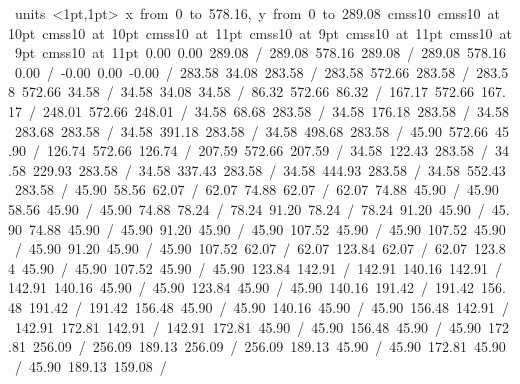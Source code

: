 \hbox{\beginpicture
\setcoordinatesystem units <1pt,1pt>
\setplotarea x from 0 to 578.16, y from 0 to 289.08
\setlinear
\font\picfont cmss10\picfont
\font\picfont cmss10 at 10pt\picfont
\font\picfont cmss10 at 10pt\picfont
\font\picfont cmss10 at 11pt\picfont
\font\picfont cmss10 at 9pt\picfont
\font\picfont cmss10 at 11pt\picfont
\font\picfont cmss10 at 9pt\picfont
\font\picfont cmss10 at 11pt\picfont
\setsolid
{} 0.00 0.00 289.08 /
 289.08 578.16 289.08 /
 289.08 578.16 0.00 /
 -0.00 0.00 -0.00 /
\setsolid
{} 283.58 34.08 283.58 /
 283.58 572.66 283.58 /
 283.58 572.66 34.58 /
 34.58 34.08 34.58 /
\setsolid
{} 86.32 572.66 86.32 /
\setsolid
{} 167.17 572.66 167.17 /
\setsolid
{} 248.01 572.66 248.01 /
\setsolid
{} 34.58 68.68 283.58 /
\setsolid
{} 34.58 176.18 283.58 /
\setsolid
{} 34.58 283.68 283.58 /
\setsolid
{} 34.58 391.18 283.58 /
\setsolid
{} 34.58 498.68 283.58 /
\setsolid
{} 45.90 572.66 45.90 /
\setsolid
{} 126.74 572.66 126.74 /
\setsolid
{} 207.59 572.66 207.59 /
\setsolid
{} 34.58 122.43 283.58 /
\setsolid
{} 34.58 229.93 283.58 /
\setsolid
{} 34.58 337.43 283.58 /
\setsolid
{} 34.58 444.93 283.58 /
\setsolid
{} 34.58 552.43 283.58 /
\setsolid
{} 45.90 58.56 62.07 /
 62.07 74.88 62.07 /
 62.07 74.88 45.90 /
 45.90 58.56 45.90 /
\setsolid
{} 45.90 74.88 78.24 /
 78.24 91.20 78.24 /
 78.24 91.20 45.90 /
 45.90 74.88 45.90 /
\setsolid
{} 45.90 91.20 45.90 /
 45.90 107.52 45.90 /
 45.90 107.52 45.90 /
 45.90 91.20 45.90 /
\setsolid
{} 45.90 107.52 62.07 /
 62.07 123.84 62.07 /
 62.07 123.84 45.90 /
 45.90 107.52 45.90 /
\setsolid
{} 45.90 123.84 142.91 /
 142.91 140.16 142.91 /
 142.91 140.16 45.90 /
 45.90 123.84 45.90 /
\setsolid
{} 45.90 140.16 191.42 /
 191.42 156.48 191.42 /
 191.42 156.48 45.90 /
 45.90 140.16 45.90 /
\setsolid
{} 45.90 156.48 142.91 /
 142.91 172.81 142.91 /
 142.91 172.81 45.90 /
 45.90 156.48 45.90 /
\setsolid
{} 45.90 172.81 256.09 /
 256.09 189.13 256.09 /
 256.09 189.13 45.90 /
 45.90 172.81 45.90 /
\setsolid
{} 45.90 189.13 159.08 /
}
